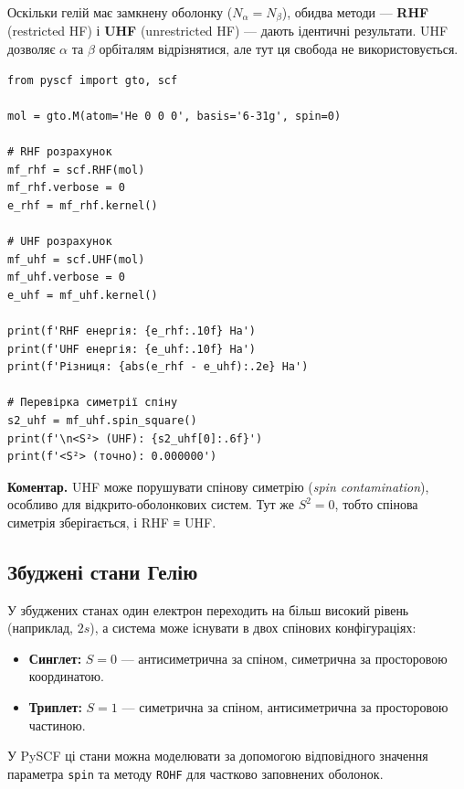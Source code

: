 Оскільки гелій має замкнену оболонку ($N_\alpha = N_\beta$), обидва методи --- \textbf{RHF} (restricted HF)
і \textbf{UHF} (unrestricted HF) --- дають ідентичні результати.
UHF дозволяє $\alpha$ та $\beta$ орбіталям відрізнятися, але тут ця свобода не використовується.

\begin{verbatim}
from pyscf import gto, scf

mol = gto.M(atom='He 0 0 0', basis='6-31g', spin=0)

# RHF розрахунок
mf_rhf = scf.RHF(mol)
mf_rhf.verbose = 0
e_rhf = mf_rhf.kernel()

# UHF розрахунок
mf_uhf = scf.UHF(mol)
mf_uhf.verbose = 0
e_uhf = mf_uhf.kernel()

print(f'RHF енергія: {e_rhf:.10f} Ha')
print(f'UHF енергія: {e_uhf:.10f} Ha')
print(f'Різниця: {abs(e_rhf - e_uhf):.2e} Ha')

# Перевірка симетрії спіну
s2_uhf = mf_uhf.spin_square()
print(f'\n<S²> (UHF): {s2_uhf[0]:.6f}')
print(f'<S²> (точно): 0.000000')
\end{verbatim}

\textbf{Коментар.}
UHF може порушувати спінову симетрію (\textit{spin conta\-mination}), особливо для відкрито-оболонкових систем.
Тут же $S^2 = 0$, тобто спінова симетрія зберігається, і RHF ≡ UHF.


\subsection{Збуджені стани Гелію}

У збуджених станах один електрон переходить на більш високий рівень (наприклад, $2s$),
а система може існувати в двох спінових конфігураціях:

\begin{itemize}
    \item \textbf{Синглет:} $S=0$ --- антисиметрична за спіном, симетрична за просторовою координатою.
    \item \textbf{Триплет:} $S=1$ --- симетрична за спіном, антисиметрична за просторовою частиною.
\end{itemize}

У PySCF ці стани можна моделювати за допомогою відповідного значення параметра \texttt{spin}
та методу \texttt{ROHF} для частково заповнених оболонок.

